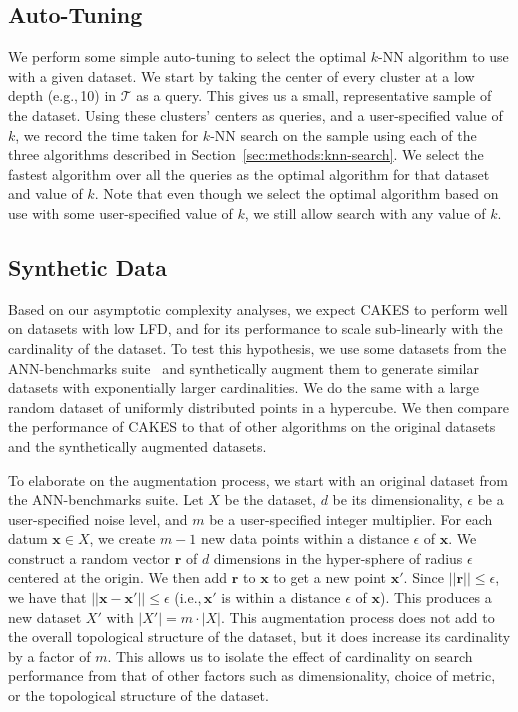 \subsection{Auto-Tuning}
\label{sec:methods:auto-tuning}

We perform some simple auto-tuning to select the optimal $k$-NN algorithm to use with a given dataset.
We start by taking the center of every cluster at a low depth (e.g.,\,10) in $\mathcal{T}$ as a query.
This gives us a small, representative sample of the dataset.
Using these clusters' centers as queries, and a user-specified value of $k$, we record the time taken for $k$-NN search on the sample using each of the three algorithms described in Section~\ref{sec:methods:knn-search}.
We select the fastest algorithm over all the queries as the optimal algorithm for that dataset and value of $k$.
Note that even though we select the optimal algorithm based on use with some user-specified value of $k$, we still allow search with any value of $k$.


\subsection{Synthetic Data}
\label{sec:methods:synthetic-data}

Based on our asymptotic complexity analyses, we expect CAKES to perform well on datasets with low LFD, and for its performance to scale sub-linearly with the cardinality of the dataset.
To test this hypothesis, we use some datasets from the ANN-benchmarks suite~\cite{aumuller2020ann} and synthetically augment them to generate similar datasets with exponentially larger cardinalities.
We do the same with a large random dataset of uniformly distributed points in a hypercube.
We then compare the performance of CAKES to that of other algorithms on the original datasets and the synthetically augmented datasets.

To elaborate on the augmentation process, we start with an original dataset from the ANN-benchmarks suite.
Let $X$ be the dataset, $d$ be its dimensionality, $\epsilon$ be a user-specified noise level, and $m$ be a user-specified integer multiplier.
For each datum $\mathbf{x} \in X$, we create $m - 1$ new data points within a distance $\epsilon$ of $\mathbf{x}$.
We construct a random vector $\mathbf{r}$ of $d$ dimensions in the hyper-sphere of radius $\epsilon$ centered at the origin.
We then add $\mathbf{r}$ to $\mathbf{x}$ to get a new point $\mathbf{x}'$.
Since $||\mathbf{r}|| \leq \epsilon$, we have that $||\mathbf{x} - \mathbf{x}'|| \leq \epsilon$ (i.e.,\,$\mathbf{x}'$ is within a distance $\epsilon$ of $\mathbf{x}$).
This produces a new dataset $X'$ with $|X'| = m \cdot |X|$.
This augmentation process does not add to the overall topological structure of the dataset, but it does increase its cardinality by a factor of $m$.
This allows us to isolate the effect of cardinality on search performance from that of other factors such as dimensionality, choice of metric, or the topological structure of the dataset.
